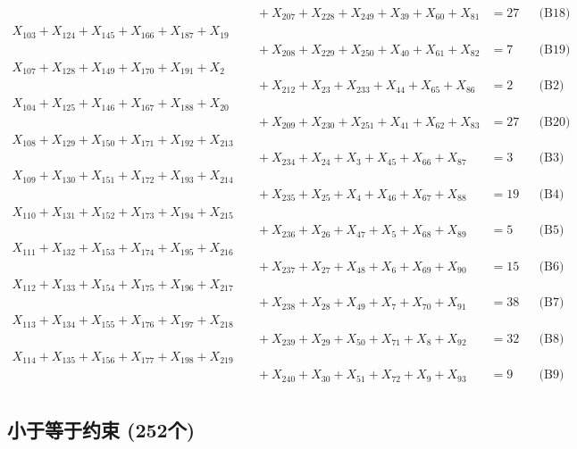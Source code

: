 \documentclass[a4paper,10pt]{article}
\begin{document}
{\begin{align}
&\quad  + X_{207} + X_{228} + X_{249} + X_{39} + X_{60} + X_{81} &= 27 && \text{(B18)} \\
X_{103} + X_{124} + X_{145} + X_{166} + X_{187} + X_{19} \\[0.5ex]
&\quad  + X_{208} + X_{229} + X_{250} + X_{40} + X_{61} + X_{82} &= 7 && \text{(B19)} \\
X_{107} + X_{128} + X_{149} + X_{170} + X_{191} + X_{2} \\[0.5ex]
&\quad  + X_{212} + X_{23} + X_{233} + X_{44} + X_{65} + X_{86} &= 2 && \text{(B2)} \\
X_{104} + X_{125} + X_{146} + X_{167} + X_{188} + X_{20} \\[0.5ex]
&\quad  + X_{209} + X_{230} + X_{251} + X_{41} + X_{62} + X_{83} &= 27 && \text{(B20)} \\
X_{108} + X_{129} + X_{150} + X_{171} + X_{192} + X_{213} \\[0.5ex]
&\quad  + X_{234} + X_{24} + X_{3} + X_{45} + X_{66} + X_{87} &= 3 && \text{(B3)} \\
X_{109} + X_{130} + X_{151} + X_{172} + X_{193} + X_{214} \\[0.5ex]
&\quad  + X_{235} + X_{25} + X_{4} + X_{46} + X_{67} + X_{88} &= 19 && \text{(B4)} \\
X_{110} + X_{131} + X_{152} + X_{173} + X_{194} + X_{215} \\[0.5ex]
&\quad  + X_{236} + X_{26} + X_{47} + X_{5} + X_{68} + X_{89} &= 5 && \text{(B5)} \\
X_{111} + X_{132} + X_{153} + X_{174} + X_{195} + X_{216} \\[0.5ex]
&\quad  + X_{237} + X_{27} + X_{48} + X_{6} + X_{69} + X_{90} &= 15 && \text{(B6)} \\
X_{112} + X_{133} + X_{154} + X_{175} + X_{196} + X_{217} \\[0.5ex]
&\quad  + X_{238} + X_{28} + X_{49} + X_{7} + X_{70} + X_{91} &= 38 && \text{(B7)} \\
X_{113} + X_{134} + X_{155} + X_{176} + X_{197} + X_{218} \\[0.5ex]
&\quad  + X_{239} + X_{29} + X_{50} + X_{71} + X_{8} + X_{92} &= 32 && \text{(B8)} \\
X_{114} + X_{135} + X_{156} + X_{177} + X_{198} + X_{219} \\[0.5ex]
&\quad  + X_{240} + X_{30} + X_{51} + X_{72} + X_{9} + X_{93} &= 9 && \text{(B9)} \\
\end{align}}

\subsection{小于等于约束 (252个)}
\end{document}

